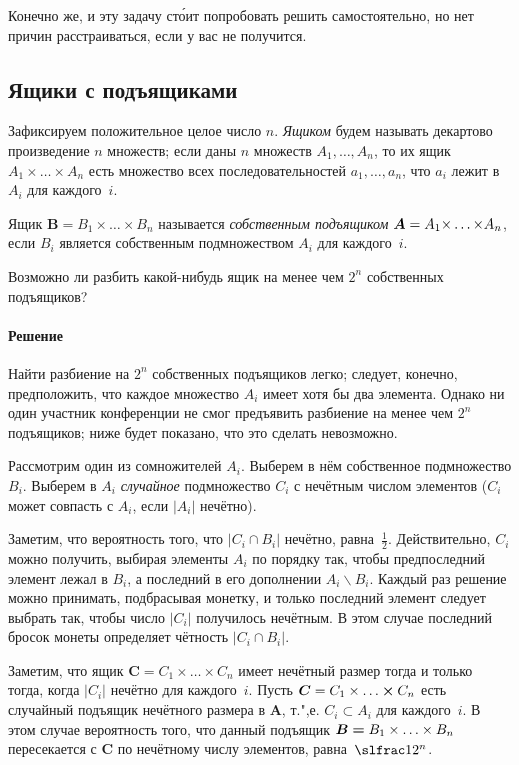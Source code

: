 \documentclass[twoside]{book}
\makeatletter
\newcommand{\rindex}[2][\imki@jobname]{%
  \index[#1]{\detokenize{#2}}%
}
\makeatother
\begin{document}
Конечно же, и эту задачу ст\'{о}ит попробовать решить самостоятельно, но нет причин расстраиваться, если у вас не получится.

\subsection*{Ящики с подъящиками}
\rindex{Ящики с подъящиками}

Зафиксируем положительное целое число $n$.
\emph{Ящиком} будем называть декартово произведение $n$ множеств;
если даны $n$ множеств $A_1,\dots,A_n$, то их ящик $A_1{\times}\dots{\times}A_n$ есть множество всех  последовательностей  $a_1,\dots,a_n$, что $a_i$ лежит в $A_i$ для каждого~$i$.

Ящик $\bm{B}=B_1{\times}\dots{\times}B_n$ называется \emph{собственным подъящиком}  $\bm{A}\z=A_1{\times}\z\dots{\times}A_n$, если $B_i$ является собственным подмножеством $A_i$ для каждого~$i$.

Возможно ли разбить какой-нибудь ящик на менее чем $2^n$ собственных подъящиков?

\paragraph{Решение}
Найти разбиение на $2^n$ собственных подъящиков легко; следует, конечно, предположить, что каждое множество $A_i$ имеет хотя бы два элемента.
Однако ни один участник конференции не смог предъявить разбиение на менее чем $2^n$ подъящиков; ниже будет показано, что это сделать невозможно.

Рассмотрим один из сомножителей $A_i$. 
Выберем в нём собственное подмножество $B_i$.
Выберем в $A_i$ \emph{случайное} подмножество $C_i$ с нечётным числом элементов ($C_i$ может совпасть с $A_i$, если $|A_i|$ нечётно).

Заметим, что вероятность того, что $|C_i\cap B_i|$ нечётно, равна~$\tfrac12$.
Действительно, 
$C_i$ можно получить, выбирая элементы  $A_i$ по порядку так, чтобы предпоследний элемент лежал в $B_i$, а последний в его дополнении $A_i\backslash B_i$.
Каждый раз решение можно принимать, подбрасывая монетку, и только последний элемент следует выбрать так, чтобы число $|C_i|$ получилось нечётным.
В этом случае последний бросок монеты определяет чётность $|C_i\cap B_i|$.

Заметим, что ящик $\bm{C}=C_1 \times\ldots\times C_n$ имеет нечётный размер тогда и только тогда, когда $|C_i|$ нечётно для каждого~$i$.
Пусть $\bm{C}=C_1 \times \ldots \hm\times C_n$ есть случайный подъящик нечётного размера в $\bm{A}$, т.",е. $C_i\subset A_i$ для каждого~$i$.
В этом случае вероятность того, что данный подъящик $\bm{B}\hm=B_1\times\ldots\times B_n$ пересекается с $\bm{C}$ по нечётному числу элементов, равна~$\slfrac1{2^n}$.
\end{document}
